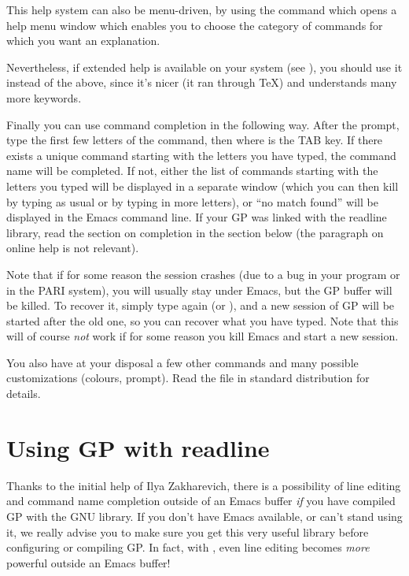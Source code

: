   This help system can also be menu-driven, by using the command
 which opens a help menu window which enables you to choose
the category of commands for which you want an explanation.

  Nevertheless, if extended help is available on your system (see
), you should use it instead of the above, since it's
nicer (it ran through \TeX) and understands many more keywords.

  Finally you can use command completion in the following way. After the
prompt, type the first few letters of the command, then  where
 is the TAB key. If there exists a unique command starting with
the letters you have typed, the command name will be completed. If not,
either the list of commands starting with the letters you typed will be
displayed in a separate window (which you can then kill by typing as usual
 or by typing in more letters), or ``no match found'' will be
displayed in the Emacs command line. If your GP was linked with the readline
library, read the section on completion in the section below (the paragraph
on online help is not relevant).

Note that if for some reason the session crashes (due to a bug in your
program or in the PARI system), you will usually stay under Emacs, but the GP
buffer will be killed. To recover it, simply type again  (or
), and a new session of GP will be started after the old one,
so you can recover what you have typed. Note that this will of course
\emph{not} work if for some reason you kill Emacs and start a new session.

\smallskip
You also have at your disposal a few other commands and many possible
customizations (colours, prompt). Read the file  in
standard distribution for details.


\section{Using GP with readline}

  Thanks to the initial help of Ilya Zakharevich, there is a possibility of
line editing and command name completion outside of an Emacs buffer
\emph{if} you have compiled GP with the GNU  library. If you
don't have Emacs available, or can't stand using it, we really advise you
to make sure you get this very useful library before configuring or
compiling GP. In fact, with , even line editing becomes
\emph{more} powerful outside an Emacs buffer!

